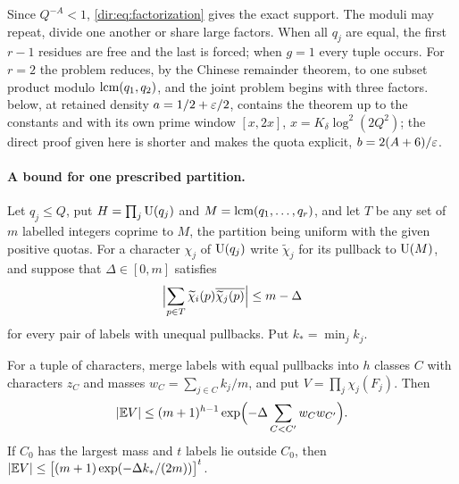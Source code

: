 Since $Q^{-A}<1$, \eqref{dir:eq:factorization} gives the exact support. The moduli may repeat,
divide one another or share large factors. When all $q_j$ are equal, the first $r-1$ residues
are free and the last is forced; when $g=1$ every tuple occurs. For $r=2$ the problem reduces,
by the Chinese remainder theorem, to one subset product modulo $\operatorname{lcm}(q_1,q_2)$, and the joint
problem begins with three factors.  below, at retained density $a=1/2+\varepsilon/2$,
contains the theorem up to the constants and with its own prime window $[x,2x]$,
$x=K_\delta\log^2(2Q^2)$; the direct proof given here is shorter and makes the quota explicit,
$b=2(A+6)/\varepsilon$.

\paragraph{A bound for one prescribed partition.}
Let $q_j\le Q$, put $H=\prod_j\mathrm{U}(q_j)$ and $M=\operatorname{lcm}(q_1,\dots,q_r)$, and let $T$ be any set
of $m$ labelled integers coprime to $M$, the partition being uniform with the given positive quotas.
For a character $\chi_j$ of $\mathrm{U}(q_j)$ write $\widetilde\chi_j$ for its pullback to $\mathrm{U}(M)$,
and suppose that $\Delta\in[0,m]$ satisfies
\begin{equation}\label{dir:eq:gap}
 \Bigl|\sum_{p\in T}\widetilde\chi_i(p)\overline{\widetilde\chi_j(p)}\Bigr|\le m-\Delta
\end{equation}
for every pair of labels with unequal pullbacks. Put $k_*=\min_jk_j$.

\begin{lemma}\label{dir:lem:partition}
For a tuple of characters, merge labels with equal pullbacks into $h$ classes $C$ with
characters $z_C$ and masses $w_C=\sum_{j\in C}k_j/m$, and put $V=\prod_j\chi_j(F_j)$. Then
\[
 \lvert\mathbb{E} V\rvert\le(m+1)^{h-1}\exp\Bigl(-\Delta\sum_{C<C'}w_Cw_{C'}\Bigr).
\]
If $C_0$ has the largest mass and $t$ labels lie outside $C_0$, then
$\lvert\mathbb{E} V\rvert\le\bigl[(m+1)\exp(-\Delta k_*/(2m))\bigr]^t$.
\end{lemma}


